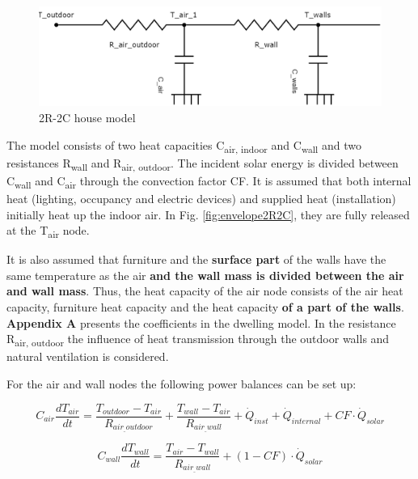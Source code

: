\begin{figure}[H]
	\centering
	\includegraphics[width=1.0\columnwidth]{Pictures/2R2C_Model.png}
	\caption[Short title]{2R-2C house model}
	\label{fig:elec2R2C}
	\end{figure}
	
The model consists of two heat capacities C\textsubscript{air, indoor} and C\textsubscript{wall} and two resistances R\textsubscript{wall} and R\textsubscript{air, outdoor}. The incident solar energy is divided between C\textsubscript{wall} and C\textsubscript{air} through the convection factor CF. It is assumed that both internal heat (lighting, occupancy and electric devices) and supplied heat (installation) initially heat up the indoor air. In Fig. \ref{fig:envelope2R2C}, they are fully released at the T\textsubscript{air} node. 

 It is also assumed that furniture and the \textbf{surface part} of the walls have the same temperature as the air \textbf{and the wall mass is divided between the air and wall mass}. Thus, the heat capacity of the air node consists of the air heat capacity, furniture heat capacity and the heat capacity \textbf{of a part of the walls}. \textbf{Appendix A} presents the coefficients in the dwelling model. In the resistance R\textsubscript{air, outdoor} the influence of heat transmission through the outdoor walls and natural ventilation is considered. 
 
For the air and wall nodes the following power balances can be set up: 

\begin{equation}
C_{air}\frac{dT_{air}}{dt}=\frac{T_{outdoor}-T_{air}}{R_{air_{\_}outdoor}} + \frac{T_{wall}-T_{air}}{R_{air_{\_}wall}} + \dot{Q}_{inst} + \dot{Q}_{internal} + CF\cdot\dot{Q}_{solar}
\end{equation}

\begin{equation}
C_{wall}\frac{dT_{wall}}{dt}=\frac{T_{air}-T_{wall}}{R_{air_{\_}wall}} + (1-CF)\cdot\dot{Q}_{solar}
\end{equation}


